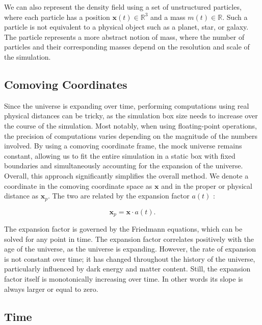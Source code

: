 \documentclass{article}
\begin{document}
We can also represent the density field using a set of unstructured particles, where each particle has a position \(\mathbf{x}(t) \in \mathbb{R}^3\) and a mass \(m(t) \in \mathbb{R}\). Such a particle is not equivalent to a physical object such as a planet, star, or galaxy. The particle represents a more abstract notion of mass, where the number of particles and their corresponding masses depend on the resolution and scale of the simulation.

\subsection{Comoving Coordinates}
Since the universe is expanding over time, performing computations using real physical distances can be tricky, as the simulation box size needs to increase over the course of the simulation. Most notably, when using floating-point operations, the precision of computations varies depending on the magnitude of the numbers involved. By using a comoving coordinate frame, the mock universe remains constant, allowing us to fit the entire simulation in a static box with fixed boundaries and simultaneously accounting for the expansion of the universe. Overall, this approach significantly simplifies the overall method. We denote a coordinate in the comoving coordinate space as \(\mathbf{x}\) and in the proper or physical distance as \(\mathbf{x}_p\). The two are related by the expansion factor \(a(t)\) \citep{schutz2003gravity}:

\begin{equation}
    \mathbf{x}_p = \mathbf{x} \cdot a(t).
\end{equation}

The expansion factor is governed by the Friedmann equations, which can be solved for any point in time. The expansion factor correlates positively with the age of the universe, as the universe is expanding. However, the rate of expansion is not constant over time; it has changed throughout the history of the universe, particularly influenced by dark energy and matter content. Still, the expansion factor itself is monotonically increasing over time. In other words its slope is always larger or equal to zero.

\subsection{Time}
\end{document}
